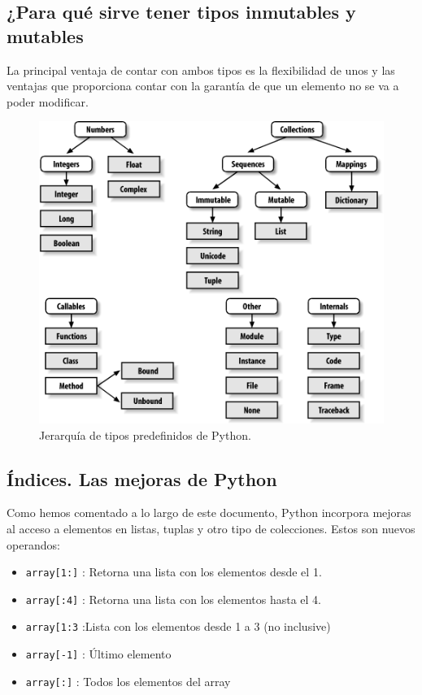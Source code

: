 \documentclass[12pt]{article} %
\begin{document}
\subsection{¿Para qué sirve tener tipos inmutables y mutables}
La principal ventaja de contar con ambos tipos es la flexibilidad de unos y las ventajas que proporciona contar con la garantía de que un elemento no se va a poder modificar.
\begin{figure} %
  \begin{center}
    \includegraphics[width=\textwidth]{tree.png}
  \end{center}
  \caption{Jerarquía de tipos predefinidos de Python.}
\end{figure}
\subsection{Índices. Las mejoras de Python}
Como hemos comentado a lo largo de este documento, Python incorpora mejoras al acceso a elementos en listas, tuplas y otro tipo de colecciones. Estos son nuevos operandos:
\begin{itemize}
	\item \verb+array[1:]+ : Retorna una lista con los elementos desde el 1.
	\item \verb+array[:4]+ : Retorna una lista con los elementos hasta el 4.
	\item \verb+array[1:3+ :Lista con los elementos desde 1 a 3 (no inclusive)
	\item \verb+array[-1]+ : Último elemento
	\item \verb+array[:]+ : Todos los elementos del array
\end{itemize}
\end{document}
